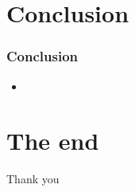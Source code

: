 \documentclass{beamer}
\begin{document}
\section{Conclusion}
\begin{frame}
\frametitle{Conclusion}
\begin{itemize}
	\item 
\end{itemize}
\end{frame}

\section{The end}
\begin{frame}
\Huge{\centerline{Thank you}}
\end{frame}
\end{document}
